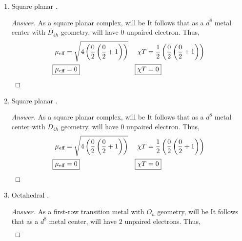 \documentclass[../psets.tex]{subfiles}
\begin{document}
\begin{enumerate}
\begin{enumerate}
\begin{proof}[Answer]
            \begin{align*}
                \mu_\text{eff} &= \sqrt{4\left( \frac{1}{2}\left( \frac{1}{2}+1 \right) \right)}&
                    \chi T &= \frac{1}{2}\left( \frac{1}{2}\left( \frac{1}{2}+1 \right) \right)\\
                \Aboxed{\mu_\text{eff} &= 1.73}&
                    \Aboxed{\chi T &= 0.375}
            \end{align*}
        \end{proof}
        \item Square planar .
        \begin{proof}[Answer]
            As a square planar complex,  will be  It follows that as a $d^8$ metal center with $D_{4h}$ geometry,  will have 0 unpaired electron. Thus,
            \begin{align*}
                \mu_\text{eff} &= \sqrt{4\left( \frac{0}{2}\left( \frac{0}{2}+1 \right) \right)}&
                    \chi T &= \frac{1}{2}\left( \frac{0}{2}\left( \frac{0}{2}+1 \right) \right)\\
                \Aboxed{\mu_\text{eff} &= 0}&
                    \Aboxed{\chi T &= 0}
            \end{align*}
        \end{proof}
        \item Square planar .
        \begin{proof}[Answer]
            As a square planar complex,  will be  It follows that as a $d^8$ metal center with $D_{4h}$ geometry,  will have 0 unpaired electron. Thus,
            \begin{align*}
                \mu_\text{eff} &= \sqrt{4\left( \frac{0}{2}\left( \frac{0}{2}+1 \right) \right)}&
                    \chi T &= \frac{1}{2}\left( \frac{0}{2}\left( \frac{0}{2}+1 \right) \right)\\
                \Aboxed{\mu_\text{eff} &= 0}&
                    \Aboxed{\chi T &= 0}
            \end{align*}
        \end{proof}
        \item Octahedral .
        \begin{proof}[Answer]
            As a first-row transition metal with $O_h$ geometry,  will be  It follows that as a $d^8$ metal center,  will have 2 unpaired electrons. Thus,
            \begin{align*}

\end{align*}
\end{proof}
\end{enumerate}
\end{enumerate}
\end{document}
